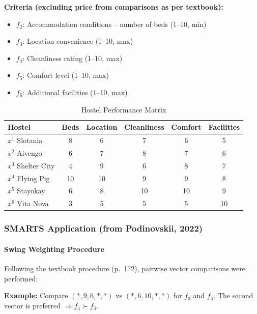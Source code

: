 \documentclass[conference]{IEEEtran}
\begin{document}
\textbf{Criteria (excluding price from comparisons as per textbook):}
\begin{itemize}
	\item $f_2$: Accommodation conditions -- number of beds (1--10, min)
	\item $f_3$: Location convenience (1--10, max)
	\item $f_4$: Cleanliness rating (1--10, max)
	\item $f_5$: Comfort level (1--10, max)
	\item $f_6$: Additional facilities (1--10, max)
\end{itemize}

\begin{table}[H]
	\centering
	\caption{Hostel Performance Matrix}
	\label{tab:hostel_data_simple}
	
	\setlength{\tabcolsep}{3pt}
	\renewcommand{\arraystretch}{1.2}
	
	\begin{tabular}{|l|c|c|c|c|c|}
		\hline
		\textbf{Hostel} & \textbf{Beds} & \textbf{Location} & \textbf{Cleanliness} & \textbf{Comfort} & \textbf{Facilities} \\
		\hline
		$x^1$ Slotania & 8 & 6 & 7 & 6 & 5 \\
		$x^2$ Aivengo & 6 & 7 & 8 & 7 & 6 \\
		$x^3$ Shelter City & 4 & 9 & 6 & 8 & 7 \\
		$x^4$ Flying Pig & 10 & 10 & 9 & 9 & 8 \\
		$x^5$ Stayokay & 6 & 8 & 10 & 10 & 9 \\
		$x^6$ Vita Nova & 3 & 5 & 5 & 5 & 10 \\
		\hline
	\end{tabular}
\end{table}

\subsubsection{SMARTS Application (from Podinovskii, 2022)}

\paragraph{Swing Weighting Procedure}

Following the textbook procedure (p.~172), pairwise vector comparisons were performed:

\textbf{Example:} Compare $(*, 9, 6, *, *)$ vs $(*, 6, 10, *, *)$ for $f_3$ and $f_4$.
The second vector is preferred $\Rightarrow f_4 \succ f_3$.
\end{document}
